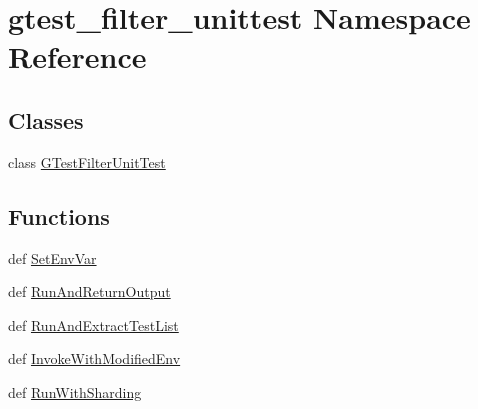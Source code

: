 \hypertarget{namespacegtest__filter__unittest}{\section{gtest\-\_\-filter\-\_\-unittest \-Namespace \-Reference}
\label{d5/dea/namespacegtest__filter__unittest}
}
\subsection*{\-Classes}
\begin{DoxyCompactItemize}
\item 
class \hyperlink{classgtest__filter__unittest_1_1GTestFilterUnitTest}{\-G\-Test\-Filter\-Unit\-Test}
\end{DoxyCompactItemize}
\subsection*{\-Functions}
\begin{DoxyCompactItemize}
\item 
def \hyperlink{namespacegtest__filter__unittest_a7f16d53c4906d45d16d3b58ceed59061}{\-Set\-Env\-Var}
\item 
def \hyperlink{namespacegtest__filter__unittest_a0857c50074aab02b06bd5d31a20c3800}{\-Run\-And\-Return\-Output}
\item 
def \hyperlink{namespacegtest__filter__unittest_ad7b84d938fa6f616b33a47ae169c66e4}{\-Run\-And\-Extract\-Test\-List}
\item 
def \hyperlink{namespacegtest__filter__unittest_a68f385a6abf5aca93bc6acd232e33602}{\-Invoke\-With\-Modified\-Env}
\item 
def \hyperlink{namespacegtest__filter__unittest_aaa465c599c34bdc805527f165ac1a832}{\-Run\-With\-Sharding}
\end{DoxyCompactItemize}

